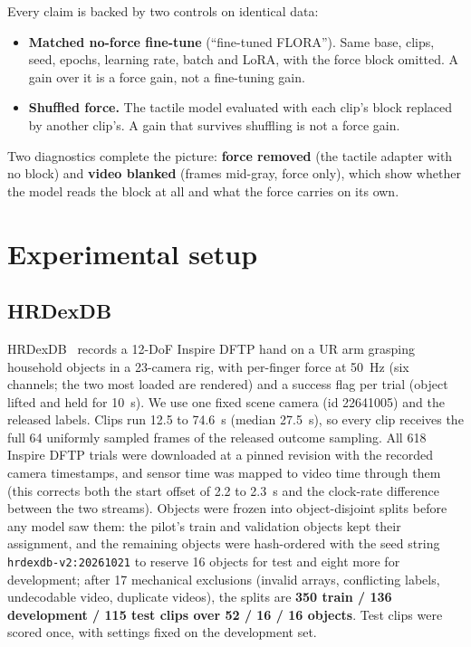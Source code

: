 \documentclass{article}
\begin{document}
Every claim is backed by two controls on identical data:
\begin{itemize}
  \item \textbf{Matched no-force fine-tune} (``fine-tuned FLORA''). Same base, clips, seed,
  epochs, learning rate, batch and LoRA, with the force block omitted. A gain over it is a force
  gain, not a fine-tuning gain.
  \item \textbf{Shuffled force.} The tactile model evaluated with each clip's block replaced by
  another clip's. A gain that survives shuffling is not a force gain.
\end{itemize}
Two diagnostics complete the picture: \textbf{force removed} (the tactile adapter with no block)
and \textbf{video blanked} (frames mid-gray, force only), which show whether the model reads the
block at all and what the force carries on its own.

\section{Experimental setup}

\subsection{HRDexDB}

HRDexDB~\cite{hrdexdb2026} records a 12-DoF Inspire DFTP hand on a UR arm grasping household
objects in a 23-camera rig, with per-finger force at 50~Hz (six channels; the two most loaded
are rendered) and a success flag per trial (object lifted and held for 10~s). We use one fixed
scene camera (id 22641005) and the released labels. Clips run 12.5 to 74.6~s (median 27.5~s), so
every clip receives the full 64 uniformly sampled frames of the released outcome sampling. All 618 Inspire DFTP
trials were downloaded at a pinned revision with the recorded camera timestamps, and sensor time
was mapped to video time through them (this corrects both the start offset of 2.2 to 2.3~s and
the clock-rate difference between the two streams). Objects were frozen into object-disjoint
splits before any model saw them: the pilot's train and validation objects kept their
assignment, and the remaining objects were hash-ordered with the seed string
\texttt{hrdexdb-v2:20261021} to reserve 16 objects for test and eight more for development;
after 17 mechanical exclusions (invalid arrays, conflicting
labels, undecodable video, duplicate videos), the splits are \textbf{350 train / 136 development
/ 115 test clips over 52 / 16 / 16 objects}. Test clips were scored once, with settings fixed on
the development set.
\end{document}
